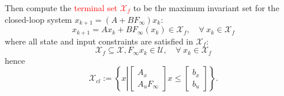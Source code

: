 Then compute the \textcolor{red}{terminal set $\mathcal{X}_f$} to be the maximum invariant set for the closed-loop system $x_{k+1} = (A+BF_\infty)x_k$:
\begin{equation*}
    x_{k+1} = Ax_k + BF_\infty(x_k) \in \mathcal{X}_f, \quad \forall \: x_k \in \mathcal{X}_f
\end{equation*}
where all state and input constraints are satisfied in $\mathcal{X}_f$:
\begin{equation*}
    \mathcal{X}_f \subseteq \mathcal{X}, F_\infty x_k \in \mathcal{U}, \quad \forall \: x_k \in \mathcal{X}_f
\end{equation*}
hence
\begin{equation*}
    \mathcal{X}_{cl} := \left\{x \left|
    \begin{bmatrix}
        A_x \\ A_u F_\infty
    \end{bmatrix}
    x \leq
    \begin{bmatrix}
        b_x \\
        b_u
    \end{bmatrix}\right.\right\}.
\end{equation*}